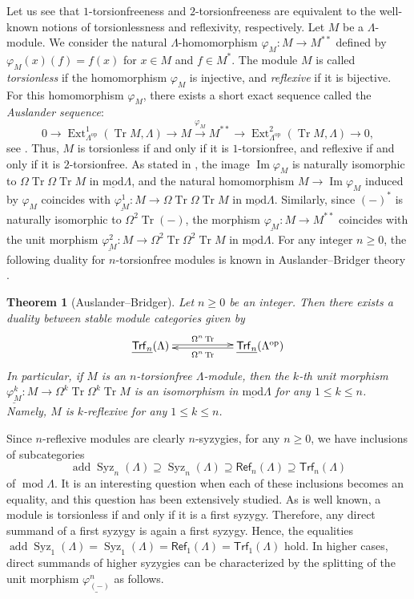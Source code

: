 \documentclass{amsart}
\newtheorem{thm}{Theorem}[section]
\theoremstyle{definition}
\theoremstyle{remark}
\numberwithin{equation}{thm}
\def\add{\operatorname{add}}
\def\Ext{\operatorname{Ext}}
\def\ge{\geqslant}
\def\image{\operatorname{Im}}
\def\le{\leqslant}
\def\lmod{\operatorname{\underline{mod}}}
\def\mod{\operatorname{mod}}
\def\refl{\mathsf{Ref}}
\def\syz{\Omega}
\def\Syz{\operatorname{Syz}}
\def\Trf{\mathsf{Trf}}
\def\tr{\operatorname{Tr}}
\begin{document}
Let us see that $1$-torsionfreeness and $2$-torsionfreeness are equivalent to the well-known notions of torsionlessness and reflexivity, respectively.
Let $M$ be a $\Lambda$-module.  
We consider the natural $\Lambda$-homomorphism $\varphi_M : M \to M^{\ast\ast}$ defined by $\varphi_M(x)(f) = f(x)$ for $x \in M$ and $f \in M^\ast$.  
The module $M$ is called {\em torsionless} if the homomorphism $\varphi_M$ is injective, and {\em reflexive} if it is bijective.
For this homomorphism $\varphi_M$, there exists a short exact sequence called the {\em Auslander sequence}:
$$
0 \to \Ext^1_{\Lambda^{\mathrm{op}}}(\tr M, \Lambda) \to M \xrightarrow{\varphi_M} M^{\ast\ast} \to \Ext^2_{\Lambda^{\mathrm{op}}}(\tr M, \Lambda) \to 0,
$$
see \cite{AusC, AB}.  
Thus, $M$ is torsionless if and only if it is $1$-torsionfree, and reflexive if and only if it is $2$-torsionfree.
As stated in \cite[Appendix]{AB}, the image $\image\varphi_M$ is naturally isomorphic to $\syz\tr\syz\tr M$ in $\lmod\Lambda$, and the natural homomorphism $M \to \image\varphi_M$ induced by $\varphi_M$ coincides with $\underline{\varphi^1_M} : M \to \syz\tr\syz\tr M$ in $\lmod\Lambda$.
Similarly, since $(-)^\ast$ is naturally isomorphic to $\syz^2 \tr(-)$, the morphism $\underline{\varphi_M} : M \to M^{\ast\ast}$ coincides with the unit morphism $\underline{\varphi^2_M} : M \to \syz^2 \tr \syz^2 \tr M$ in $\lmod\Lambda$.
For any integer $n\ge0$, the following duality for $n$-torsionfree modules is known in Auslander--Bridger theory \cite[Theorem 2.17]{AB}.

\begin{thm}[Auslander--Bridger]\label{trfdual}
Let $n\ge0$ be an integer. Then there exists a duality between stable module categories given by
$$
\xymatrix{
\underline{\Trf_n}(\Lambda)\ar@<.5mm>[rr]^-{\syz^n\tr}
&&\underline{\Trf_n}(\Lambda^{\mathrm{op}})\ar@<.5mm>[ll]^-{\syz^n\tr}
}
$$
In particular, if $M$ is an $n$-torsionfree $\Lambda$-module, then the $k$-th unit morphism $\underline{\varphi^k_M}:M\to\syz^k\tr\syz^k\tr M$ is an isomorphism in $\lmod\Lambda$ for any $1\le k\le n$. Namely, $M$ is $k$-reflexive for any $1\le k\le n$.
\end{thm}

Since $n$-reflexive modules are clearly $n$-syzygies, for any $n \ge 0$, we have inclusions of subcategories
$$
\add\Syz_n(\Lambda) \supseteq \Syz_n(\Lambda) \supseteq \refl_n(\Lambda) \supseteq \Trf_n(\Lambda)
$$
of $\mod\Lambda$. It is an interesting question when each of these inclusions becomes an equality, and this question has been extensively studied. 
As is well known, a module is torsionless if and only if it is a first syzygy.  
Therefore, any direct summand of a first syzygy is again a first syzygy.
Hence, the equalities $\add\Syz_1(\Lambda) = \Syz_1(\Lambda) = \refl_1(\Lambda) = \Trf_1(\Lambda)$ hold. 
In higher cases, direct summands of higher syzygies can be characterized by the splitting of the unit morphism $\underline{\varphi^n_{(-)}}$ as follows.
\end{document}
